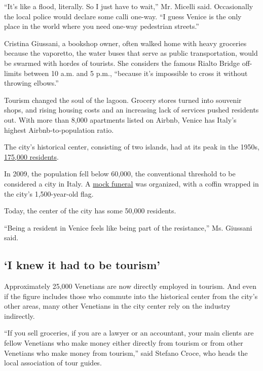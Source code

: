 ``It's like a flood, literally. So I just have to wait,'' Mr. Micelli
said. Occasionally the local police would declare some calli one-way.
``I guess Venice is the only place in the world where you need one-way
pedestrian streets.''

Cristina Giussani, a bookshop owner, often walked home with heavy
groceries because the vaporetto, the water buses that serve as public
transportation, would be swarmed with hordes of tourists. She considers
the famous Rialto Bridge off-limits between 10 a.m. and 5 p.m.,
``because it's impossible to cross it without throwing elbows.''

Tourism changed the soul of the lagoon. Grocery stores turned into
souvenir shops, and rising housing costs and an increasing lack of
services pushed residents out. With more than 8,000 apartments listed on
Airbnb, Venice has Italy's highest Airbnb-to-population ratio.

The city's historical center, consisting of two islands, had at its peak
in the 1950s,
\href{https://nuovavenezia.gelocal.it/venezia/cronaca/2015/02/23/news/da-175-000-a-56-000-abitanti-cosi-si-svuota-venezia-1.10921951}{175,000
residents}.

In 2009, the population fell below 60,000, the conventional threshold to
be considered a city in Italy. A
\href{https://www.nytimes3xbfgragh.onion/2009/11/15/world/europe/15venice.html}{mock
funeral} was organized, with a coffin wrapped in the city's
1,500-year-old flag.

Today, the center of the city has some 50,000 residents.

``Being a resident in Venice feels like being part of the resistance,''
Ms. Giussani said.

\hypertarget{i-knew-it-had-to-be-tourism}{%
\subsection{`I knew it had to be
tourism'}\label{i-knew-it-had-to-be-tourism}}

Approximately 25,000 Venetians are now directly employed in tourism. And
even if the figure includes those who commute into the historical center
from the city's other areas, many other Venetians in the city center
rely on the industry indirectly.

``If you sell groceries, if you are a lawyer or an accountant, your main
clients are fellow Venetians who make money either directly from tourism
or from other Venetians who make money from tourism,'' said Stefano
Croce, who heads the local association of tour guides.

